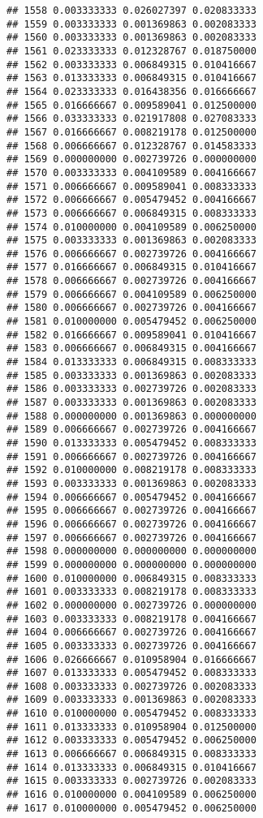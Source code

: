 \documentclass[
]{article}
\begin{document}
\begin{verbatim}
## 1558 0.003333333 0.026027397 0.020833333
## 1559 0.003333333 0.001369863 0.002083333
## 1560 0.003333333 0.001369863 0.002083333
## 1561 0.023333333 0.012328767 0.018750000
## 1562 0.003333333 0.006849315 0.010416667
## 1563 0.013333333 0.006849315 0.010416667
## 1564 0.023333333 0.016438356 0.016666667
## 1565 0.016666667 0.009589041 0.012500000
## 1566 0.033333333 0.021917808 0.027083333
## 1567 0.016666667 0.008219178 0.012500000
## 1568 0.006666667 0.012328767 0.014583333
## 1569 0.000000000 0.002739726 0.000000000
## 1570 0.003333333 0.004109589 0.004166667
## 1571 0.006666667 0.009589041 0.008333333
## 1572 0.006666667 0.005479452 0.004166667
## 1573 0.006666667 0.006849315 0.008333333
## 1574 0.010000000 0.004109589 0.006250000
## 1575 0.003333333 0.001369863 0.002083333
## 1576 0.006666667 0.002739726 0.004166667
## 1577 0.016666667 0.006849315 0.010416667
## 1578 0.006666667 0.002739726 0.004166667
## 1579 0.006666667 0.004109589 0.006250000
## 1580 0.006666667 0.002739726 0.004166667
## 1581 0.010000000 0.005479452 0.006250000
## 1582 0.016666667 0.009589041 0.010416667
## 1583 0.006666667 0.006849315 0.004166667
## 1584 0.013333333 0.006849315 0.008333333
## 1585 0.003333333 0.001369863 0.002083333
## 1586 0.003333333 0.002739726 0.002083333
## 1587 0.003333333 0.001369863 0.002083333
## 1588 0.000000000 0.001369863 0.000000000
## 1589 0.006666667 0.002739726 0.004166667
## 1590 0.013333333 0.005479452 0.008333333
## 1591 0.006666667 0.002739726 0.004166667
## 1592 0.010000000 0.008219178 0.008333333
## 1593 0.003333333 0.001369863 0.002083333
## 1594 0.006666667 0.005479452 0.004166667
## 1595 0.006666667 0.002739726 0.004166667
## 1596 0.006666667 0.002739726 0.004166667
## 1597 0.006666667 0.002739726 0.004166667
## 1598 0.000000000 0.000000000 0.000000000
## 1599 0.000000000 0.000000000 0.000000000
## 1600 0.010000000 0.006849315 0.008333333
## 1601 0.003333333 0.008219178 0.008333333
## 1602 0.000000000 0.002739726 0.000000000
## 1603 0.003333333 0.008219178 0.004166667
## 1604 0.006666667 0.002739726 0.004166667
## 1605 0.003333333 0.002739726 0.004166667
## 1606 0.026666667 0.010958904 0.016666667
## 1607 0.013333333 0.005479452 0.008333333
## 1608 0.003333333 0.002739726 0.002083333
## 1609 0.003333333 0.001369863 0.002083333
## 1610 0.010000000 0.005479452 0.008333333
## 1611 0.013333333 0.010958904 0.012500000
## 1612 0.003333333 0.005479452 0.006250000
## 1613 0.006666667 0.006849315 0.008333333
## 1614 0.013333333 0.006849315 0.010416667
## 1615 0.003333333 0.002739726 0.002083333
## 1616 0.010000000 0.004109589 0.006250000
## 1617 0.010000000 0.005479452 0.006250000

\end{verbatim}
\end{document}
